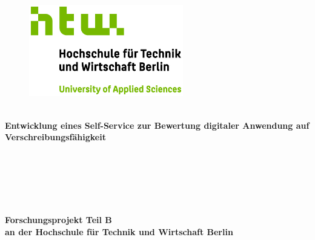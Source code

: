  \thispagestyle{empty}
\begin{titlepage}
	 \thispagestyle{empty}
\begin{center}
	 \thispagestyle{empty}
\begin{figure}[t]
	\centering
	\includegraphics[width=0.6\textwidth]{assets/HTW_Logo.jpg}
	
\end{figure}

$~~$\\
\textbf{\huge Entwicklung eines Self-Service zur Bewertung digitaler Anwendung auf Verschreibungsfähigkeit }\paragraph{}$~~$\\
\paragraph{}$~~$\\
\paragraph{}$~~$\\
\textbf{Forschungsprojekt Teil B}\\ \textbf{an der Hochschule für Technik und Wirtschaft Berlin}

\end{center}
\end{titlepage}
